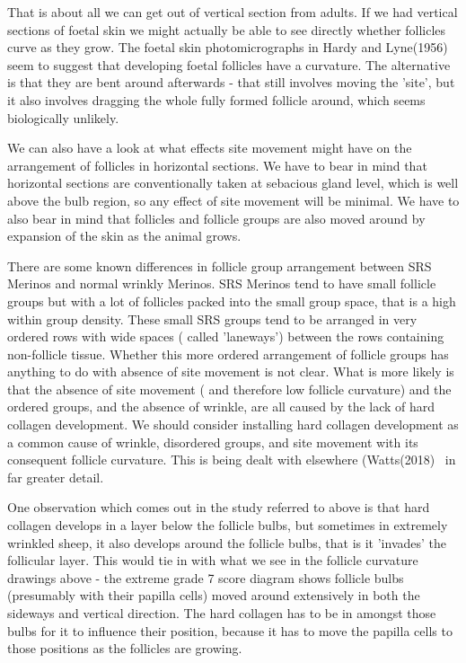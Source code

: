 \documentclass[titlepage]{article}  %
\begin{document}
That is about all we can get out of vertical section from adults. If we had vertical sections of foetal skin we might actually be able to see directly whether follicles curve as they grow. The foetal skin photomicrographs in Hardy and Lyne(1956)~\cite{hard:56} seem to suggest that developing foetal follicles have a curvature. The alternative is that they are bent around afterwards - that still involves moving the 'site', but it also involves dragging the whole fully formed follicle around, which seems biologically unlikely.

We can also have a look at what effects site movement might have on the arrangement of follicles in horizontal sections. We have to bear in mind that horizontal sections are conventionally taken at sebacious gland level, which is well above the bulb region, so any effect of site movement will be minimal. We have to also bear in mind that  follicles and follicle groups are also moved around by expansion of the skin as the animal grows. 

There are some known differences in follicle group arrangement between SRS Merinos and normal wrinkly Merinos.  SRS Merinos tend to have small follicle groups but with a lot of follicles packed into the small group space, that is a high within group density. These small SRS groups tend to be arranged in very ordered rows with wide spaces ( called 'laneways') between the rows containing non-follicle tissue. Whether this more ordered arrangement of follicle groups has  anything to do with absence of site movement is not clear.  What is more likely is that the absence of site movement ( and therefore low follicle curvature) and the ordered groups, and the absence of wrinkle, are all caused by the lack of hard collagen development.  We should consider installing  hard collagen development as a common cause of wrinkle, disordered groups, and site movement with its consequent follicle curvature. This is being dealt with elsewhere (Watts(2018)~\cite{watt:18} in far greater detail.

One observation which comes out in the study referred to above is that hard collagen develops in a layer below the follicle bulbs, but sometimes in extremely wrinkled sheep, it also develops around the follicle bulbs, that is it 'invades' the follicular layer. This would tie in with what we see in the follicle curvature drawings above - the extreme grade 7 score diagram shows follicle bulbs (presumably with their papilla cells) moved around extensively in both the sideways and vertical direction. The hard collagen has to be in amongst those bulbs for it to influence their position, because it has to move the papilla cells to those positions as the follicles are growing.
\end{document}
